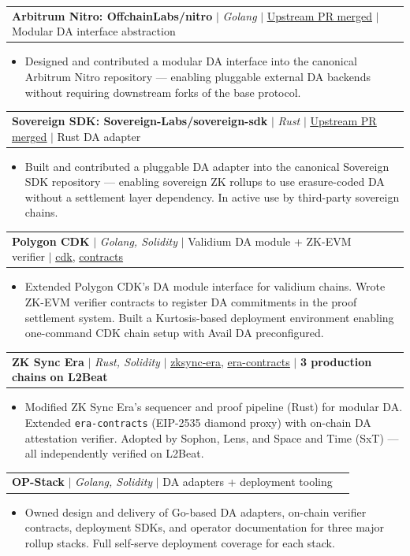 \documentclass[letterpaper,11pt]{article}
\makeatletter
\newcommand{\resumeItem}[1]{
  \item\small{{#1 \vspace{-2pt}}}
}
\newcommand{\resumeProjectHeading}[2]{
    \item
    \begin{tabular*}{0.97\textwidth}{l@{\extracolsep{\fill}}r}
      \small#1 & #2 \\
    \end{tabular*}\vspace{-7pt}
}
\newcommand{\resumeItemListStart}{\begin{itemize}}
\newcommand{\resumeItemListEnd}{\end{itemize}\vspace{-5pt}}
\makeatother
\begin{document}
  \resumeProjectHeading
    {\textbf{Arbitrum Nitro: OffchainLabs/nitro} $|$ \emph{Golang} $|$ \href{https://github.com/OffchainLabs/nitro/pull/2666}{\underline{Upstream PR merged}} $|$ Modular DA interface abstraction}{}
    \resumeItemListStart
      \resumeItem{Designed and contributed a modular DA interface into the canonical Arbitrum Nitro repository — enabling pluggable external DA backends without requiring downstream forks of the base protocol.}
    \resumeItemListEnd

  \resumeProjectHeading
    {\textbf{Sovereign SDK: Sovereign-Labs/sovereign-sdk} $|$ \emph{Rust} $|$ \href{https://github.com/Sovereign-Labs/sovereign-sdk/pull/1709}{\underline{Upstream PR merged}} $|$ Rust DA adapter}{}
    \resumeItemListStart
      \resumeItem{Built and contributed a pluggable DA adapter into the canonical Sovereign SDK repository — enabling sovereign ZK rollups to use erasure-coded DA without a settlement layer dependency. In active use by third-party sovereign chains.}
    \resumeItemListEnd

    \resumeProjectHeading
    {\textbf{Polygon CDK} $|$ \emph{Golang, Solidity} $|$ Validium DA module + ZK-EVM verifier $|$ \href{https://github.com/availproject/cdk}{\underline{cdk}}, \href{https://github.com/availproject/cdk-zkevm-contracts}{\underline{contracts}}}{}
    \resumeItemListStart
      \resumeItem{Extended Polygon CDK's DA module interface for validium chains. Wrote ZK-EVM verifier contracts to register DA commitments in the proof settlement system. Built a Kurtosis-based deployment environment enabling one-command CDK chain setup with Avail DA preconfigured.}
    \resumeItemListEnd

  \resumeProjectHeading
    {\textbf{ZK Sync Era} $|$ \emph{Rust, Solidity} $|$ \href{https://github.com/availproject/zksync-era}{\underline{zksync-era}}, \href{https://github.com/availproject/era-contracts}{\underline{era-contracts}} $|$ \textbf{3 production chains on L2Beat}}{}
    \resumeItemListStart
      \resumeItem{Modified ZK Sync Era's sequencer and proof pipeline (Rust) for modular DA. Extended \texttt{era-contracts} (EIP-2535 diamond proxy) with on-chain DA attestation verifier. Adopted by Sophon, Lens, and Space and Time (SxT) — all independently verified on L2Beat.}
    \resumeItemListEnd

  \resumeProjectHeading
    {\textbf{OP-Stack} $|$ \emph{Golang, Solidity} $|$ DA adapters + deployment tooling}{}
    \resumeItemListStart
      \resumeItem{Owned design and delivery of Go-based DA adapters, on-chain verifier contracts, deployment SDKs, and operator documentation for three major rollup stacks. Full self-serve deployment coverage for each stack.}
    \resumeItemListEnd
\end{document}
